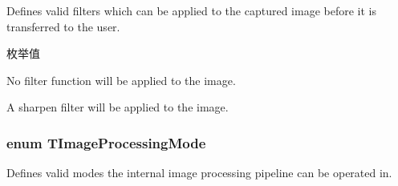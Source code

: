 Defines valid filters which can be applied to the captured image before it is transferred to the user. 

\begin{Desc}
\item[枚举值]\par
\begin{description}
\item[{\em 
\hypertarget{group___common_interface_gga78ae15c334c800044e1b7042975fc829a953dbdd7c2771ee95fdeb426fafa8aa4}{ipf\+Off}\label{group___common_interface_gga78ae15c334c800044e1b7042975fc829a953dbdd7c2771ee95fdeb426fafa8aa4}
}]No filter function will be applied to the image. \item[{\em 
\hypertarget{group___common_interface_gga78ae15c334c800044e1b7042975fc829ac6321769819525cbf794435809a2980e}{ipf\+Sharpen}\label{group___common_interface_gga78ae15c334c800044e1b7042975fc829ac6321769819525cbf794435809a2980e}
}]A sharpen filter will be applied to the image. \end{description}
\end{Desc}
\hypertarget{group___common_interface_gaee0074fce284fcdf9ead4ad607e85a06}{
\subsubsection[{T\+Image\+Processing\+Mode}]{\setlength{\rightskip}{0pt plus 5cm}enum {\bf T\+Image\+Processing\+Mode}}}\label{group___common_interface_gaee0074fce284fcdf9ead4ad607e85a06}


Defines valid modes the internal image processing pipeline can be operated in. 

